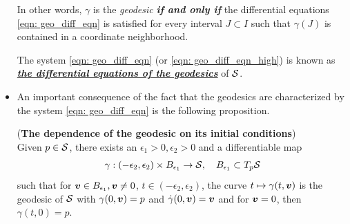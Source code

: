 \documentclass[11pt]{article}
\begin{document}
\begin{itemize}
In other words, $\gamma$ is the \emph{geodesic} \emph{\textbf{if and only if}} the differential equations \eqref{eqn: geo_diff_eqn} is satisfied for every interval $J \subset I$ such that $\gamma(J)$ is contained in a coordinate neighborhood. 

The system \eqref{eqn: geo_diff_eqn} (or \eqref{eqn: geo_diff_eqn_high}) is known as \underline{\emph{\textbf{the differential equations of the geodesics}}} of ${\mathcal S}$.

\item An important consequence of the fact that the geodesics are characterized by the system \eqref{eqn: geo_diff_eqn} is the following proposition.
\begin{theorem}\label{thm: exp_map_unique}
(\textbf{The dependence of the geodesic on its initial conditions}) \citep{do1976differential}\\
Given $p\in {\mathcal S}$, there exists an $\epsilon_{1}>0, \epsilon_{2}>0$ and a differentiable map 
\begin{align*}
\gamma: (-\epsilon_{2}, \epsilon_{2}) \times B_{\epsilon_{1}} \rightarrow {\mathcal S}, \quad  B_{\epsilon_{1}}\subset T_{p}{\mathcal S}
\end{align*}
such that for $\boldsymbol{v}\in B_{\epsilon_{1}}, \boldsymbol{v}\neq 0$, $t\in (-\epsilon_{2}, \epsilon_{2})$, the curve $t\mapsto \gamma(t,\boldsymbol{v})$ is the geodesic of ${\mathcal S}$ with $\gamma(0,\boldsymbol{v}) = p$ and $\dot{\gamma}(0,\boldsymbol{v}) = \boldsymbol{v}$ and for $\boldsymbol{v} =0$, then $\gamma(t,0) = p$.
\end{theorem}
\end{itemize}
\end{document}
